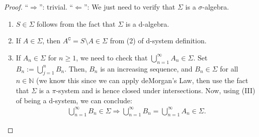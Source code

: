 \documentclass[11pt]{article}
\theoremstyle{definition}
\theoremstyle{theorem}
\newcommand{\N}[0]{\mathbb{N}}
\newcommand{\comp}[1]{{#1}^{\texttt{C}}}
\begin{document}
\begin{proof}
	``\( \Rightarrow \)'': trivial.
	\newline
	``\( \Leftarrow \)'': We just need to verify that \( \Sigma \) is a \( \sigma \)-algebra.
	\begin{enumerate}[noitemsep]
		\item \( S \in \Sigma \) follows from the fact that \( \Sigma \) is a d-algebra. 
		\item If \( A \in \Sigma \), then \( \comp{A} = S \setminus A  \in \Sigma \) from (2) of d-system definition. 
		\item If \( A_n \in \Sigma \) for \( n \geq 1 \), we need to check that \( \bigcup_{n=1}^\infty A_n \in \Sigma \). 
		\newline
		\newline
		Set \( B_n := \bigcup_{j=1}^n B_n \). Then, \( B_n \) is an increasing sequence, and \( B_n \in \Sigma \) for all \( n \in \N \) (we know this since we can apply deMorgan's Law, then use the fact that \( \Sigma \) is a \( \pi \)-system and is hence closed under intersections. Now, using (III) of being a d-system, we can conclude:
		\begin{align*}
			\bigcup_{n=1}^\infty B_n \in \Sigma \Rightarrow \bigcup_{n=1}^\infty B_n = \bigcup_{n=1}^\infty A_n \in \Sigma.
		\end{align*}
	\end{enumerate}
\end{proof}
\end{document}
